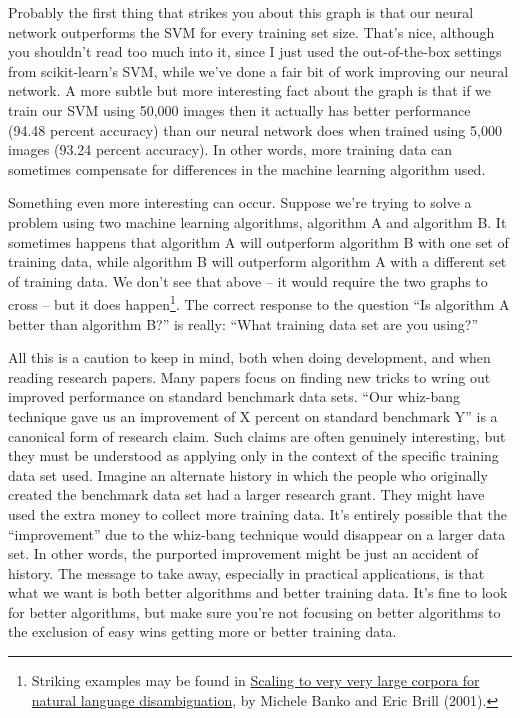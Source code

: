 \documentclass[a4paper,twoside,10pt]{book}
\begin{document}
Probably the first thing that strikes you about this graph is that our neural network outperforms the SVM for every training set size. That's nice, although you shouldn't read too much into it, since I just used the out-of-the-box settings from scikit-learn's SVM, while we've done a fair bit of work improving our neural network. A more subtle but more interesting fact about the graph is that if we train our SVM using 50,000 images then it actually has better performance (94.48 percent accuracy) than our neural network does when trained using 5,000 images (93.24 percent accuracy). In other words, more training data can sometimes compensate for differences in the machine learning algorithm used.

Something even more interesting can occur. Suppose we're trying to solve a problem using two machine learning algorithms, algorithm A and algorithm B. It sometimes happens that algorithm A will outperform algorithm B with one set of training data, while algorithm B will outperform algorithm A with a different set of training data. We don't see that above -- it would require the two graphs to cross -- but it does happen\footnote{Striking examples may be found in \href{http://dx.doi.org/10.3115/1073012.1073017}{Scaling to very very large corpora for natural language disambiguation}, by Michele Banko and Eric Brill (2001).}. The correct response to the question ``Is algorithm A better than algorithm B?'' is really: ``What training data set are you using?''

All this is a caution to keep in mind, both when doing development, and when reading research papers. Many papers focus on finding new tricks to wring out improved performance on standard benchmark data sets. ``Our whiz-bang technique gave us an improvement of X percent on standard benchmark Y'' is a canonical form of research claim. Such claims are often genuinely interesting, but they must be understood as applying only in the context of the specific training data set used. Imagine an alternate history in which the people who originally created the benchmark data set had a larger research grant. They might have used the extra money to collect more training data. It's entirely possible that the ``improvement'' due to the whiz-bang technique would disappear on a larger data set. In other words, the purported improvement might be just an accident of history. The message to take away, especially in practical applications, is that what we want is both better algorithms and better training data. It's fine to look for better algorithms, but make sure you're not focusing on better algorithms to the exclusion of easy wins getting more or better training data.
\end{document}
